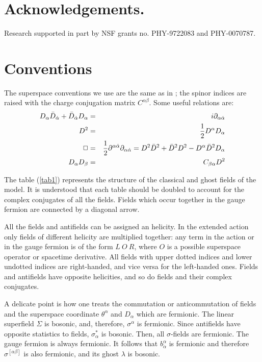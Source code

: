 \documentclass[a4paper,12pt]{article}
\begin{document}

\medskip
\section*{Acknowledgements.}
\noindent
Research supported in part by NSF grants no. PHY-9722083 and
PHY-0070787.

\newpage


\appendix

\section{Conventions}
 \label{app:conventions}

The superspace conventions we use are the same as in \cite{GPZ}; the
spinor indices are raised with the charge conjugation matrix
$C^{\alpha\beta}$. Some useful relations are: 
\begin{eqnarray}
 D_\alpha\bar D_{\dot \alpha}+
 \bar D_{\dot \alpha}  D_\alpha &=& i\partial_{\alpha\dot \alpha}
 \nonumber\\ 
 D^2&=& {1 \over 2} D^\alpha D_\alpha\nonumber\\
 \Box&=&{1 \over 2} \partial^{\alpha\dot \alpha}\partial_{\alpha\dot \alpha}=
 D^2\bar D^2+\bar D^2 D^2-D^\alpha\bar  D^2D_\alpha\nonumber\\
 D_\alpha D_\beta&=&C_{\beta\alpha}D^2    \label{conv}
\end{eqnarray}

The table (\ref{tab1}) represents the structure of the classical and
ghost fields of the model. It is understood that each table should be
doubled to account for the complex conjugates of all the fields. 
Fields which occur together in the gauge fermion are connected by a
diagonal arrow. 

All the fields and antifields can be assigned an helicity. In the
extended action only fields of different helicity are multiplied
together: any term in the action or in the gauge fermion is of the
form $L\ O\ R$, where $O$ is a possible superspace operator or
spacetime derivative. All fields with upper dotted indices and lower
undotted indices are right-handed, and vice versa for the left-handed
ones. Fields and antifields have opposite helicities, and so do fields
and their complex conjugates.

A delicate point is how one treats the commutation or
anticommutation of fields and the superspace coordinate $\theta^\alpha$
and $D_\alpha$ which are fermionic. The linear superfield $\Sigma$
is bosonic, and, therefore, $\sigma^\alpha$ is fermionic. Since
antifields have opposite statistics to
fields, $\sigma^*_\alpha$ is bosonic. Then, 
all $\sigma$-fields are
fermionic. The gauge fermion is always fermionic.
It follows that $b^\alpha_{\dot \alpha}$ is fermionic and therefore
$\sigma^{[\alpha\beta]}$ is also fermionic, and its ghost $\lambda$ is
bosonic. 
\end{document}

